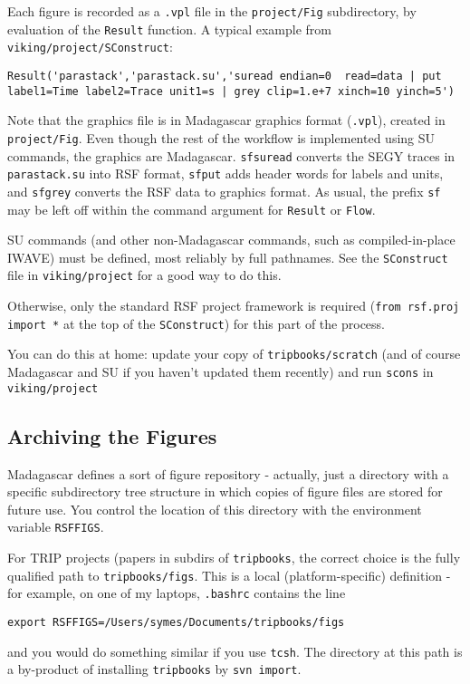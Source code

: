 Each figure is recorded as a {\tt .vpl} file in the {\tt project/Fig} subdirectory, by evaluation of the {\tt Result} function. A typical example from {\tt viking/project/SConstruct}: 
\begin{verbatim}
Result('parastack','parastack.su','suread endian=0  read=data | put label1=Time label2=Trace unit1=s | grey clip=1.e+7 xinch=10 yinch=5')
\end{verbatim}
Note that the graphics file is in Madagascar graphics format ({\tt .vpl}), created in {\tt project/Fig}. Even though the rest of the workflow is implemented using SU commands, the graphics are Madagascar. {\tt sfsuread} converts the SEGY traces in {\tt parastack.su} into RSF format, {\tt sfput} adds header words for labels and units, and {\tt sfgrey} converts the RSF data to graphics format. As usual, the prefix {\tt sf} may be left off within the command argument for {\tt Result} or {\tt Flow}.

SU commands (and other non-Madagascar commands, such as compiled-in-place IWAVE) must be defined, most reliably by full pathnames. See the {\tt SConstruct} file in {\tt viking/project} for a good way to do this.

Otherwise, only the standard RSF project framework is required ({\tt from rsf.proj import *} at the top of the {\tt SConstruct}) for this part of the process.

You can do this at home: update your copy of {\tt tripbooks/scratch} (and of course Madagascar and SU if you haven't updated them recently) and run {\tt scons} in {\tt viking/project}

\subsection{Archiving the Figures}
Madagascar defines a sort of figure repository - actually, just a directory with a specific subdirectory tree structure in which copies of figure files are stored for future use. You control the location of this directory with the environment variable {\tt RSFFIGS}.

For TRIP projects (papers in subdirs of {\tt tripbooks}, the correct choice is the fully qualified path to {\tt tripbooks/figs}. This is a local (platform-specific) definition - for example, on one of my laptops, {\tt .bashrc} contains the line
\begin{verbatim}
export RSFFIGS=/Users/symes/Documents/tripbooks/figs
\end{verbatim}
and you would do something similar if you use {\tt tcsh}. The directory at this path is a by-product of installing {\tt tripbooks} by {\tt svn import}.

